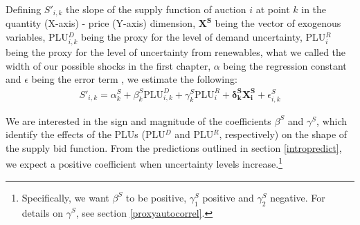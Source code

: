 
Defining $S'_{i,k}$ the slope of the supply function of auction $i$ at point $k$ in the quantity (X-axis) - price (Y-axis) dimension, %
$\boldsymbol{X^S}$ being the vector of exogenous variables, PLU$^D_{i,k}$ being the proxy for the level of demand uncertainty, PLU$^R_i$ being the proxy for the level of uncertainty from renewables, what we called the width of our possible shocks in the first chapter, $\alpha$ being the regression constant and $\epsilon$ being the error term%
, we estimate the following:
\begin{eqnarray}
\label{secondstagereg2}
S'_{i,k} =\alpha_{k}^S+ \beta_{k}^S \text{PLU}^D_{i,k} + \gamma_{k}^S \text{PLU}^R_{i} + \boldsymbol{\delta_{k}^S X^S_i}+\epsilon_{i,k}^S
\end{eqnarray}

We are interested in the sign and magnitude of the coefficients $\beta^S$ and $\gamma^S$, which identify the effects of the PLUs (PLU$^D$ and PLU$^R$, respectively) on the shape of the supply bid function. From the predictions outlined in section \ref{intropredict}, we expect a positive coefficient when uncertainty levels increase.\footnote{Specifically, we want $\beta^S$ to be positive, $\gamma^S_1$ positive and $\gamma^S_2$ negative. For details on $\gamma^S$, see section \ref{proxyautocorrel}.}\\ %




